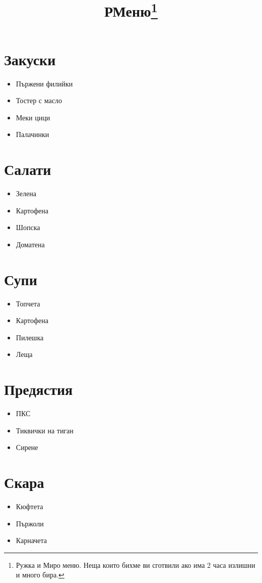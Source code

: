 \documentclass{article}
\title{РМеню\footnote{Ружка и Миро меню. Неща които бихме ви сготвили ако има 2 часа излишни и много бира.}}
\begin{document}
\maketitle
\begin{multicols}{3}
\section{Закуски}
\begin{itemize}
    \item{Пържени филийки}
    \item{Тостер с масло}
    \item{Меки цици}
    \item{Палачинки}
\end{itemize}

\section{Салати}
\begin{itemize}
    \item{Зелена}
    \item{Картофена}
    \item{Шопска}
    \item{Доматена}
\end{itemize}

\section{Супи}
\begin{itemize}
    \item{Топчета}
    \item{Картофена}
    \item{Пилешка}
    \item{Леща}
\end{itemize}

\section{Предястия}
\begin{itemize}
    \item{ПКС}
    \item{Тиквички на тиган}
    \item{Сирене}
\end{itemize}

\section{Скара}
\begin{itemize}
    \item{Кюфтета}
    \item{Пържоли}
    \item{Карначета}
\end{itemize}


\end{multicols}
\end{document}
